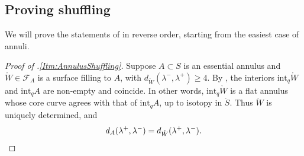 \documentclass[11pt,letterpaper]{amsart}
\newcommand{\mc}{\mathcal}
\newcommand{\mr}{\mathring}
\newcommand{\psub}{\mr W}
\newcommand{\Fix}{\operatorname{Fix}}
\numberwithin{equation}{section}
\theoremstyle{definition}
\newcommand{\C}{\mathcal{C}}
\renewcommand{\int}{\mathrm{int}}
\begin{document}
%    
%    
%    
%    
%    
%    
%    
%    
%    
%    
%    


\subsection{Proving shuffling}\label{Sec:ShufflingProof}

We will prove the statements of  in reverse order, starting from the easiest case of annuli.

\begin{proof}[Proof of .\eqref{Itm:AnnulusShuffling}]
Suppose $A \subset S$ is an essential annulus and $\psub  \in \mc F_A$ is a surface filling to $A$, with $d_{\psub}(\lambda^-, \lambda^+) \geq 4$. By  , the interiors  $\int_q \psub$ and $\int_q A$ are non-empty and coincide. In other words, $\int_q \psub$ is a flat annulus whose core curve agrees with that of $\int_q A$, up to isotopy in $\mr S$. Thus $\psub$ is uniquely determined, and
\[
d_A(\lambda^+, \lambda^-) = d_{\psub}(\lambda^+, \lambda^-). \qedhere
\]
\end{proof}
\end{document}

